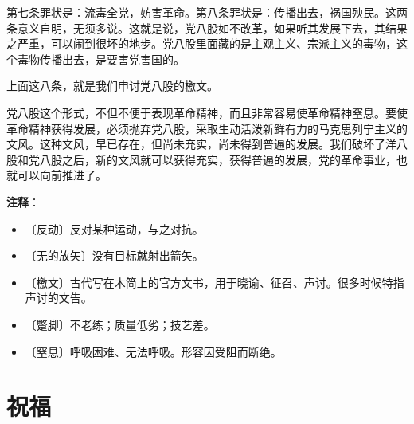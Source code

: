 \documentclass[12pt,UTF-8,openany]{ctexbook}
\begin{document}
\begin{large}
    第七条罪状是：流毒全党，妨害革命。第八条罪状是：传播出去，祸国殃民。这两条意义自明，无须多说。这就是说，党八股如不改革，如果听其发展下去，其结果之严重，可以闹到很坏的地步。党八股里面藏的是主观主义、宗派主义的毒物，这个毒物传播出去，是要害党害国的。
    
    上面这八条，就是我们申讨党八股的檄文。
    
    党八股这个形式，不但不便于表现革命精神，而且非常容易使革命精神窒息。要使革命精神获得发展，必须抛弃党八股，采取生动活泼新鲜有力的马克思列宁主义的文风。这种文风，早已存在，但尚未充实，尚未得到普遍的发展。我们破坏了洋八股和党八股之后，新的文风就可以获得充实，获得普遍的发展，党的革命事业，也就可以向前推进了。
    
\end{large}


\newpage

\textbf{注释}：

\vspace{-1em}

\begin{itemize}
    \setlength\itemsep{-0.2em}
    \item 〔反动〕反对某种运动，与之对抗。
    \item 〔无的放矢〕没有目标就射出箭矢。
    \item 〔檄文〕古代写在木简上的官方文书，用于晓谕、征召、声讨。很多时候特指声讨的文告。
    \item 〔蹩脚〕不老练；质量低劣；技艺差。
    \item 〔窒息〕呼吸困难、无法呼吸。形容因受阻而断绝。
\end{itemize}

\chapter{祝福}
\end{document}
